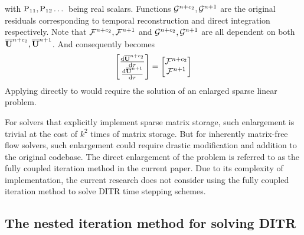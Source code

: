 with $\mathrm{P}_{11},\mathrm{P}_{12} \dots$ being real scalars.
Functions $\mathcal{G}^{n+c_2},\mathcal{G}^{n+1}$ are the original residuals
corresponding to temporal reconstruction  and
direct integration  respectively. Note that
$\mathcal{F}^{n+c_2},\mathcal{F}^{n+1}$ and $\mathcal{G}^{n+c_2},\mathcal{G}^{n+1}$ are all
dependent on both $\overline{\mathbf{U}}^{n+c_2},\overline{\mathbf{U}}^{n+1}$.
And consequently  becomes
\begin{equation}
    \begin{bmatrix}
        \derivative{\uu^{n+c_2}}{\tau} \\
        \derivative{\uu^{n+1}}{\tau}
    \end{bmatrix} =
    \begin{bmatrix}
        \FF^{n+c_2} \\
        \FF^{n+1}
    \end{bmatrix}
    \label{eq:DITRNaiveDualTime}
\end{equation}
Applying  directly to 
would require the solution of an enlarged sparse linear problem.

For solvers that explicitly implement sparse matrix storage,
such enlargement is trivial at the cost of $k^2$ times
of matrix storage. But for inherently matrix-free flow solvers,
such enlargement could require drastic modification and addition to
the original codebase.
The direct enlargement of the problem is referred to as
the fully coupled iteration method in the current paper.
Due to its complexity of implementation,
the current research does not consider using the
fully coupled iteration method
to solve DITR time stepping schemes.




\subsection{The nested iteration method for solving DITR}

